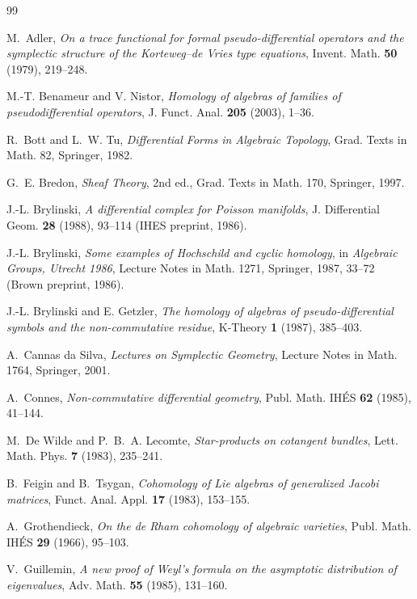 \documentclass[11pt,oneside,reqno]{article}
\theoremstyle{plain}
\theoremstyle{definition}
\theoremstyle{remark}
\begin{document}
\begin{thebibliography}{99}

M.~Adler,
\emph{On a trace functional for formal pseudo-differential operators and the
symplectic structure of the Korteweg--de Vries type equations},
Invent. Math. \textbf{50} (1979), 219--248.

M.-T. Benameur and V. Nistor,
\emph{Homology of algebras of families of pseudodifferential operators},
J. Funct. Anal. \textbf{205} (2003), 1--36.

R.~Bott and L.~W. Tu,
\emph{Differential Forms in Algebraic Topology},
Grad. Texts in Math. 82, Springer, 1982.

G.~E. Bredon,
\emph{Sheaf Theory}, 2nd ed., Grad. Texts in Math. 170, Springer, 1997.

J.-L. Brylinski,
\emph{A differential complex for Poisson manifolds},
J. Differential Geom. \textbf{28} (1988), 93--114 (IHES preprint, 1986).

J.-L. Brylinski,
\emph{Some examples of Hochschild and cyclic homology},
in \emph{Algebraic Groups, Utrecht 1986}, Lecture Notes in Math. 1271, Springer,
1987, 33--72 (Brown preprint, 1986).

J.-L. Brylinski and E. Getzler,
\emph{The homology of algebras of pseudo-differential symbols and the
non-commutative residue},
K-Theory \textbf{1} (1987), 385--403.

A.~Cannas da Silva,
\emph{Lectures on Symplectic Geometry}, Lecture Notes in Math. 1764, Springer, 2001.

A.~Connes,
\emph{Non-commutative differential geometry},
Publ. Math. IHÉS \textbf{62} (1985), 41--144.

M.~De Wilde and P.~B.~A. Lecomte,
\emph{Star-products on cotangent bundles},
Lett. Math. Phys. \textbf{7} (1983), 235--241.

B.~Feigin and B.~Tsygan,
\emph{Cohomology of Lie algebras of generalized Jacobi matrices},
Funct. Anal. Appl. \textbf{17} (1983), 153--155.

A.~Grothendieck,
\emph{On the de Rham cohomology of algebraic varieties},
Publ. Math. IHÉS \textbf{29} (1966), 95--103.

V.~Guillemin,
\emph{A new proof of Weyl's formula on the asymptotic distribution of
eigenvalues}, Adv. Math. \textbf{55} (1985), 131--160.


\end{thebibliography}
\end{document}

